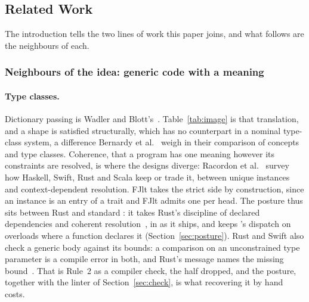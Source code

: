 \subsection{Related Work}
\label{sec:related}

The introduction tells the two lines of work this paper joins, and what follows are the neighbours of each.

\subsubsection*{Neighbours of the idea: generic code with a meaning}

\paragraph{Type classes.}
Dictionary passing is Wadler and Blott's~\cite{wadler1989adhoc}.
Table~\ref{tab:image} is that translation, and a shape is satisfied structurally, which has no counterpart in a nominal type-class system, a difference Bernardy et al.~\cite{bernardy2010generic} weigh in their comparison of concepts and type classes.
Coherence, that a program has one meaning however its constraints are resolved, is where the designs diverge: Racordon et al.~\cite{racordon2025coherence} survey how Haskell, Swift, Rust and Scala keep or trade it, between unique instances and context-dependent resolution.
FJlt takes the strict side by construction, since an instance is an entry of a trait and FJlt admits one per head.
The posture thus sits between Rust and standard \Cpp{}: it takes Rust's discipline of declared dependencies and coherent resolution~\cite{rustreference}, in  as it ships, and keeps \Cpp{}'s dispatch on overloads where a function declares it (Section~\ref{sec:posture}).
Rust and Swift also check a generic body against its bounds: a comparison on an unconstrained type parameter is a compile error in both, and Rust's message names the missing bound~\cite{klabnik2023rust,swift2026generics}.
That is Rule~2 as a compiler check, the half  dropped, and the posture, together with the linter of Section~\ref{sec:check}, is what recovering it by hand costs.


